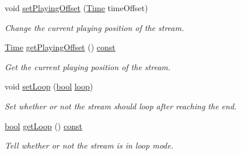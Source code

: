 \begin{DoxyCompactItemize}
void \hyperlink{classsf_1_1_sound_stream_af416a5f84c8750d2acb9821d78bc8646}{set\-Playing\-Offset} (\hyperlink{classsf_1_1_time}{Time} time\-Offset)
\begin{DoxyCompactList}\small\item\em Change the current playing position of the stream. \end{DoxyCompactList}\item 
\hyperlink{classsf_1_1_time}{Time} \hyperlink{classsf_1_1_sound_stream_a6070416e1e1a11b5915e9314dd6638f7}{get\-Playing\-Offset} () \hyperlink{term__entry_8h_a57bd63ce7f9a353488880e3de6692d5a}{const} 
\begin{DoxyCompactList}\small\item\em Get the current playing position of the stream. \end{DoxyCompactList}\item 
void \hyperlink{classsf_1_1_sound_stream_a43fade018ffba7e4f847a9f00b353f3d}{set\-Loop} (\hyperlink{term__entry_8h_a002004ba5d663f149f6c38064926abac}{bool} \hyperlink{_lapin_8cpp_ae75dc9a105e970734a903222f40b464c}{loop})
\begin{DoxyCompactList}\small\item\em Set whether or not the stream should loop after reaching the end. \end{DoxyCompactList}\item 
\hyperlink{term__entry_8h_a002004ba5d663f149f6c38064926abac}{bool} \hyperlink{classsf_1_1_sound_stream_ad8bbf6c0d2ff2d75e19035dea3fd77c3}{get\-Loop} () \hyperlink{term__entry_8h_a57bd63ce7f9a353488880e3de6692d5a}{const} 
\begin{DoxyCompactList}\small\item\em Tell whether or not the stream is in loop mode. \end{DoxyCompactList}\end{DoxyCompactItemize}
